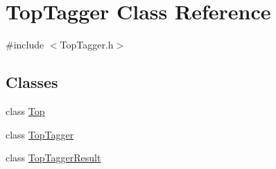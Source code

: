\hypertarget{classTopTagger}{\section{Top\-Tagger Class Reference}
\label{classTopTagger}
}


{\ttfamily \#include $<$Top\-Tagger.\-h$>$}

\subsection*{Classes}
\begin{DoxyCompactItemize}
\item 
class \hyperlink{classTopTagger_1_1Top}{Top}
\item 
class \hyperlink{classTopTagger_1_1TopTagger}{Top\-Tagger}
\item 
class \hyperlink{classTopTagger_1_1TopTaggerResult}{Top\-Tagger\-Result}
\end{DoxyCompactItemize}
